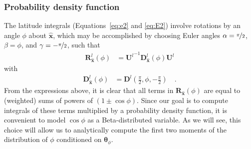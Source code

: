 \documentclass[modern]{aastex62}
\begin{document}
\subsubsection{Probability density function}
%
The latitude integrals (Equations~\ref{eq:e2} and \ref{eq:E2}) involve
rotations by an angle $\phi$ about $\hat{\mathbf{x}}$, which
may be accomplished by choosing
Euler angles $\alpha = \nicefrac{\pi}{2}$, $\beta = \phi$, and
$\gamma = -\nicefrac{\pi}{2}$, such that
%
\begin{align}
    \mathbf{R}^l_{\hat{\mathbf{x}}}(\phi)
     & =
    {\mathbf{U}^l}^{-1} \mathbf{D}^l_{\hat{\mathbf{x}}}(\phi) \mathbf{U}^l
\end{align}
%
with
\begin{align}
    \mathbf{D}^l_{\hat{\mathbf{x}}}(\phi)
     & =
    \mathbf{D}^l\left(\frac{\pi}{2}, \phi, -\frac{\pi}{2}\right)
    \quad.
\end{align}
%
From the expressions above, it is clear that all terms in
$\mathbf{R}_{\hat{\mathbf{x}}}(\phi)$ are equal to (weighted) sums of powers
of $(1 \pm \cos\phi)$.
%
Since our goal is to compute integrals of these terms multiplied by
a probability density function, it is convenient to model
$\cos\phi$ as a Beta-distributed variable. As we will see, this
choice will allow us to
analytically compute the first two moments of the distribution of
$\phi$ conditioned on $\pmb{\theta}_\phi$.
\end{document}
